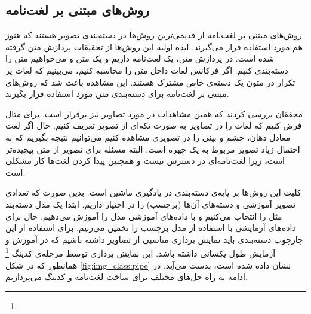 \documentclass[11pt]{article}
\begin{document}
\subsection{روش‌های مبتنی بر لغت‌نامه}\label{sec:img_class:vocab_based}
روش‌های مبتنی بر لغت‌نامه از قدیمی‌ترین روش‌ها در دسته‌بندی تصویر هستند که هنوز هم مورد استفاده قرار می‌گیرند. ایده اولیه این روش‌ها از تحقیقات پردازش متن گرفته شده است. در پردازش متن، یک لغت‌نامه داریم و یک متن  و می‌خواهیم متن را دسته‌بندی کنیم. اگر فرکانس لغات داخل متن را محاسبه کنیم، می‌بینیم که لغات پر تکرار در متون یک دسته‌ی خاص مشترک هستند. این مشاهده باعث شد که روش‌های مبتنی بر لغت‌نامه برای دسته‌بندی متن مورد استفاده قرار بگیرند.

محققان بررسی کردند که همین مشاهدات در مورد تصاویر نیز برقرار است. برای مثال فرض کنیم که لغات را در تصاویر به صورت تکه‌ای از تصویر تعریف کنیم. حال اگر لغت معادل دهان، چشم و بینی را در تصویری مشاهده کنیم می‌توانیم نتیجه بگیریم که به احتمال زیاد تصویر مربوط به یک چهره است. البته مسئله برای تصویر از متن پیچیده‌تر است، زیرا لغت‌نامه‌ای در دسترس نیست و همچنین پیدا کردن لغت‌ها کار مشکلی است.

کلیت این روش‌ها بر پایه‌ی دسته‌بندی در یادگیری ماشین است. بدین صورت که تعدادی تصویر آموزشی و دسته‌های آن‌ها (برچسب) را در اختیار داریم. ابتدا یک مدل دسته‌بند مثل
 \cite{svm}
را انتخاب می‌کنیم و با داده‌های آموزشی مدل را آموزش می‌دهیم. حال برای داده‌های آزمایشی با استفاده از مدل برچسب را تخمین می‌زنیم. برای استفاده از این چارچوب دسته‌بندی باید نمایش برداری مناسبی از تصاویر داشته باشیم که در آموزش و آزمایش طول یکسانی داشته باشد. این نمایش برداری توسط مرحله‌ی کدینگ
\footnote{}
همانطور که در شکل
\ref{fig:img_class:pipe}
نشان داده شده است، بدست می‌آید.
در ادامه به راه حل‌های مختلف برای ساخت لغت‌نامه و کدینگ می‌پردازیم.
\end{document}

